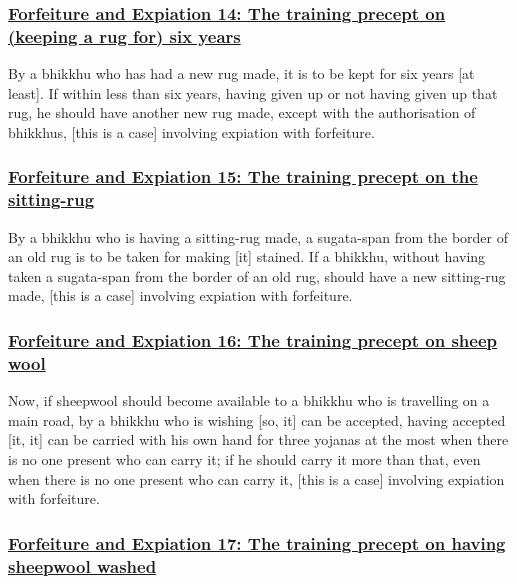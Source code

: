\subsubsection*{\hyperref[np14]{Forfeiture and Expiation 14: The training precept on (keeping a rug for) six years}}
\label{forf-exp14}

By a bhikkhu who has had a new rug made, it is to be kept for six years [at least]. If within less than six years, having given up or not having given up that rug, he should have another new rug made, except with the authorisation of bhikkhus, [this is a case] involving expiation with forfeiture.



\subsubsection*{\hyperref[np15]{Forfeiture and Expiation 15: The training precept on the sitting-rug}}
\label{forf-exp15}

By a bhikkhu who is having a sitting-rug made, a sugata-span from the border of an old rug is to be taken for making [it] stained. If a bhikkhu, without having taken a sugata-span from the border of an old rug, should have a new sitting-rug made, [this is a case] involving expiation with forfeiture.



\subsubsection*{\hyperref[np16]{Forfeiture and Expiation 16: The training precept on sheep wool}}
\label{forf-exp16}

Now, if sheepwool should become available to a bhikkhu who is travelling on a main road, by a bhikkhu who is wishing [so, it] can be accepted, having accepted [it, it] can be carried with his own hand for three yojanas at the most when there is no one present who can carry it; if he should carry it more than that, even when there is no one present who can carry it, [this is a case] involving expiation with forfeiture.



\subsubsection*{\hyperref[np17]{Forfeiture and Expiation 17: The training precept on having sheepwool washed}}
\label{forf-exp17}

